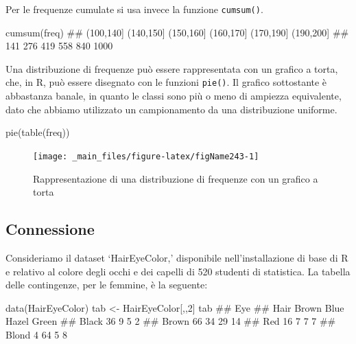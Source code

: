 \documentclass[a4paper,12pt,oneside]{book}
\newenvironment{Shaded}{\begin{snugshade}}{\end{snugshade}}
\newcommand{\DecValTok}[1]{#1}
\newcommand{\DocumentationTok}[1]{#1}
\newcommand{\OtherTok}[1]{#1}
\newcommand{\FunctionTok}[1]{#1}
\newcommand{\NormalTok}[1]{#1}
\begin{document}
Per le frequenze cumulate si usa invece la funzione \texttt{cumsum()}.

\begin{Shaded}
\begin{Highlighting}[]
\FunctionTok{cumsum}\NormalTok{(freq)}
\DocumentationTok{\#\# (100,140] (140,150] (150,160] (160,170] (170,190] (190,200] }
\DocumentationTok{\#\#       141       276       419       558       840      1000}
\end{Highlighting}
\end{Shaded}

Una distribuzione di frequenze può essere rappresentata con un grafico a torta, che, in R, può essere disegnato con le funzioni \texttt{pie()}. Il grafico sottostante è abbastanza banale, in quanto le classi sono più o meno di ampiezza equivalente, dato che abbiamo utilizzato un campionamento da una distribuzione uniforme.

\begin{Shaded}
\begin{Highlighting}[]
\FunctionTok{pie}\NormalTok{(}\FunctionTok{table}\NormalTok{(freq))}
\end{Highlighting}
\end{Shaded}

\begin{figure}

{\centering \texttt{[image: \_main\_files/figure-latex/figName243-1]} 

}

\caption{Rappresentazione di una distribuzione di frequenze con un grafico a torta}\label{fig:figName243}
\end{figure}

\hypertarget{connessione-1}{%
\subsection{Connessione}\label{connessione-1}}

Consideriamo il dataset `HairEyeColor,' disponibile nell'installazione di base di R e relativo al colore degli occhi e dei capelli di 520 studenti di statistica. La tabella delle contingenze, per le femmine, è la seguente:

\begin{Shaded}
\begin{Highlighting}[]
\FunctionTok{data}\NormalTok{(HairEyeColor)}
\NormalTok{tab }\OtherTok{\textless{}{-}}\NormalTok{ HairEyeColor[,,}\DecValTok{2}\NormalTok{]}
\NormalTok{tab}
\DocumentationTok{\#\#        Eye}
\DocumentationTok{\#\# Hair    Brown Blue Hazel Green}
\DocumentationTok{\#\#   Black    36    9     5     2}
\DocumentationTok{\#\#   Brown    66   34    29    14}
\DocumentationTok{\#\#   Red      16    7     7     7}
\DocumentationTok{\#\#   Blond     4   64     5     8}
\end{Highlighting}
\end{Shaded}
\end{document}
